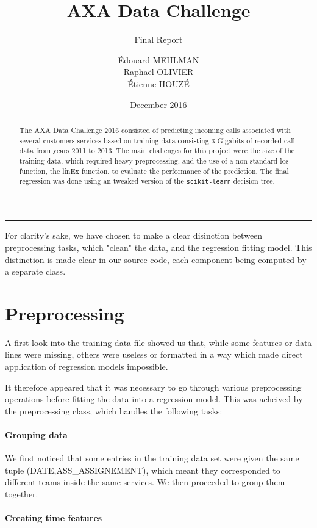 \documentclass[a4paper,10pt]{article}
\title{AXA Data Challenge}
\subtitle{Final Report}
\author{Édouard MEHLMAN\\
        Raphaël OLIVIER\\
        Étienne HOUZÉ}
\date{December 2016}
\begin{document}
  \maketitle

\begin{abstract}
  The AXA Data Challenge 2016 consisted of predicting incoming calls associated with several customers services based on training data consisting 3 Gigabits of recorded call data from years 2011 to 2013. The main challenges for this project were the size of the training data, which required heavy preprocessing, and the use of a non standard los function, the linEx function, to evaluate the performance of the prediction. The final regression was done using an tweaked version of the {\tt scikit-learn} decision tree.
\end{abstract}
\begin{center}
\rule{5cm}{0.4pt}
\end{center}

For clarity's sake, we have chosen to make a clear disinction between preprocessing tasks, which "clean" the data, and the regression fitting model. This distinction is made clear in our source code, each component being computed by a separate class.

\part{Preprocessing}

  A first look into the training data file showed us that, while some features or data lines were missing, others were useless or formatted in a way which made direct application of regression models impossible.

  It therefore appeared that it was necessary to go through various preprocessing operations before fitting the data into a regression model. This was acheived by the preprocessing class, which handles the following tasks:

    \subsection{Grouping data}

    We first noticed that some entries in the training data set were given the same tuple (DATE,ASS\_ASSIGNEMENT), which meant they corresponded to different teams inside the same services. We then proceeded to group them together.

    \subsection{Creating time features}
\end{document}
